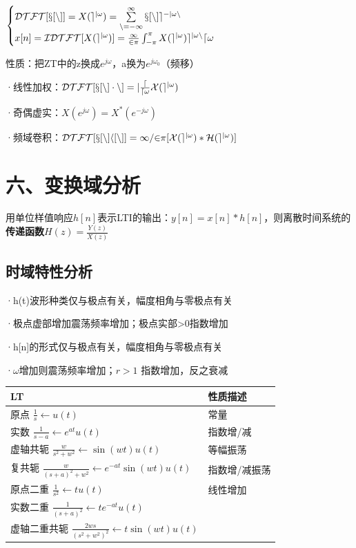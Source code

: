 $\begin{cases} \cal{DTFT}[x[n]]=\mathnormal X(e^{j\omega})=\sum\limits_{n=-\infty}^\infty{x[n]e^{-j\omega n}}\\x[n]=\cal{IDTFT}[\mathnormal X(e^{j\omega})]=\frac{1}{2\pi}\int_{-\pi}^{\pi}\mathnormal X(e^{j\omega})e^{j\omega n}d\omega\end{cases}$

性质：把ZT中的z换成$e^{j\omega}$，a换为$e^{j\omega_0}$（频移）

·线性加权：$\cal{DTFT}[x[n]\cdot n]=j\frac{d}{d\omega}X(e^{j\omega})$

·奇偶虚实：$X(e^{j\omega})=X^*(e^{-j\omega})$

·频域卷积：$\cal{DTFT}[x[n]h[n]]=1/2\pi[X(e^{j\omega})*H(e^{j\omega})]$

\section*{六、变换域分析}

用单位样值响应$h[n]$表示LTI的输出：$y[n]\!=\!x[n]\!*\!h[n]$，则离散时间系统的\textbf{传递函数}$H(z)=\tfrac{Y(z)}{X(z)}$

\subsection*{时域特性分析}

·h(t)波形种类仅与极点有关，幅度相角与零极点有关

·极点虚部增加震荡频率增加；极点实部>0指数增加

·h[n]的形式仅与极点有关，幅度相角与零极点有关

·$\omega$增加则震荡频率增加；$r>1$ 指数增加，反之衰减
\begin{center}
\begin{tabularx}{\columnwidth}{|X|p{35pt}|}
	\hline
	\textbf{LT} & \textbf{性质描述} \\ \hline
	原点 $\frac{1}{s} \gets u(t)$  & 常量 \\ \hline
	实数 $\frac{1}{s-a} \gets e^{at}u(t)$ & 指数增/减 \\ \hline
	虚轴共轭 $\frac{w}{s^2+w^2} \gets \sin(wt)u(t)$ & 等幅振荡 \\ \hline
	复共轭 $\frac{w}{(s+a)^2+w^2} \gets e^{-at}\sin(wt)u(t)$ & \tiny{指数增/减振荡} \\ \hline
	原点二重 $\frac{1}{s^2} \gets tu(t)$ & 线性增加 \\ \hline
	实数二重 $\frac{1}{(s+a)^2} \gets te^{-at}u(t)$ &  \\ \hline
	虚轴二重共轭 $\frac{2ws}{(s^2+w^2)^2} \!\gets\! t\sin(wt)u(t)$ &  \\ \hline
\end{tabularx}
\end{center}

